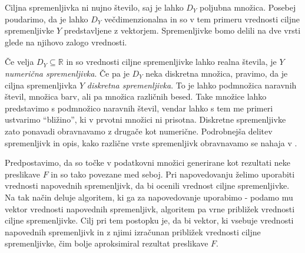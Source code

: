 \documentclass[12pt,a4paper,twoside]{article}
\theoremstyle{definition} %
\theoremstyle{plain} %
\numberwithin{equation}{section}  %
\newcommand{\R}{\mathbb R}
\begin{document}
Ciljna spremenljivka ni nujno število, saj je lahko $D_Y$ poljubna množica.
Posebej poudarimo, da je lahko $D_Y$ večdimenzionalna in so v tem primeru vrednosti ciljne spremenljivke $Y$ predstavljene z vektorjem.
Spremenljivke bomo delili na dve vrsti glede na njihovo zalogo vrednosti.

Če velja $D_Y \subseteq \R$ in so vrednosti ciljne spremenljivke lahko realna števila, je $Y$ \emph{numerična spremenljivka}.
Če pa je $D_Y$ neka diskretna množica, pravimo, da je ciljna spremenljivka $Y$ \emph{diskretna spremenljivka}.
To je lahko podmnožica naravnih števil, množica barv, ali pa množica različnih besed. 
Take množice lahko predstavimo s podmnožico naravnih števil, vendar lahko s tem me primeri ustvarimo ``bližino'', ki v prvotni množici ni prisotna. 
Diskretne spremenljivke zato ponavadi obravnavamo z drugače kot numerične.
Podrobnejša delitev spremenljivk in opis, kako različne vrste spremenljivk obravnavamo se nahaja v \cite[pogl. 10]{flach2012machine}.


Predpostavimo, da so točke v podatkovni množici generirane kot rezultati neke preslikave $F$ in so tako povezane med seboj.
Pri napovedovanju želimo uporabiti vrednosti napovednih spremenljivk, da bi ocenili vrednost ciljne spremenljivke.
Na tak način deluje algoritem, ki ga za napovedovanje uporabimo - podamo mu vektor vrednosti napovednih spremenljivk, algoritem pa vrne približek vrednosti ciljne spremenljivke.
Cilj pri tem postopku je, da bi vektor, ki vsebuje vrednosti napovednih spremenljivk in z njimi izračunan približek vrednosti ciljne spremenljivke, čim bolje aproksimiral rezultat preslikave $F$.
\end{document}
